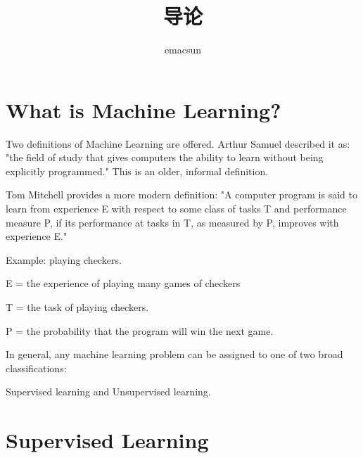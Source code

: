\documentclass[10pt,a4paper,UTF8]{article}
\author{emacsun}
\date{}
\title{导论}
\begin{document}
\maketitle
\tableofcontents
{}
\section{What is Machine Learning?}
\label{sec:orgad312ea}

Two definitions of Machine Learning are offered. Arthur Samuel described it as: "the field of study that gives computers the ability to learn without being explicitly programmed." This is an older, informal definition.

Tom Mitchell provides a more modern definition: "A computer program is said to learn from experience E with respect to some class of tasks T and performance measure P, if its performance at tasks in T, as measured by P, improves with experience E."

Example: playing checkers.

E = the experience of playing many games of checkers

T = the task of playing checkers.

P = the probability that the program will win the next game.

In general, any machine learning problem can be assigned to one of two broad classifications:

Supervised learning and Unsupervised learning.

\section{Supervised Learning}
\label{sec:orgfe6b04f}
\end{document}
